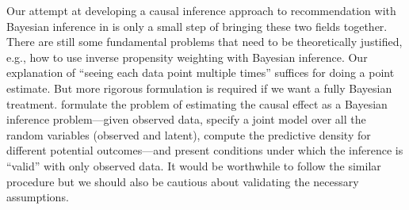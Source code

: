  Our attempt at developing a causal inference approach to recommendation with Bayesian inference in  is only a small step of bringing these two fields together. There are still some fundamental problems that need to be theoretically justified, e.g., how to use inverse propensity weighting with Bayesian inference. Our explanation of ``seeing each data point multiple times'' suffices for doing a point estimate. But more rigorous formulation is required if we want a fully Bayesian treatment. \citet{rubin1978bayesian} formulate the problem of estimating the causal effect as a Bayesian inference problem---given observed data, specify a joint model over all the random variables (observed and latent), compute the predictive density for different potential outcomes---and present conditions under which the inference is ``valid'' with only observed data. It would be worthwhile to follow the similar procedure but we should also be cautious about validating the necessary assumptions. 
